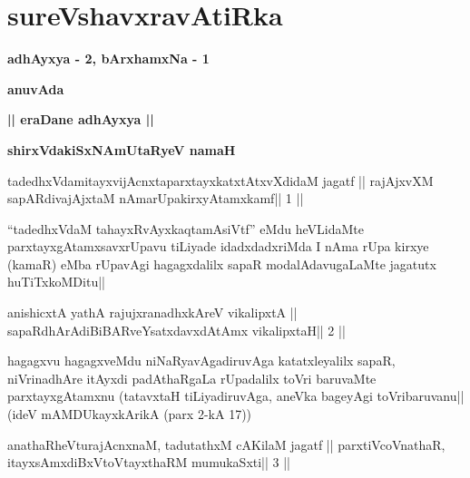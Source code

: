 \chapter{sureVshavxravAtiRka}

\begin{center}
{\Large\textbf{adhAyxya - 2, bArxhamxNa - 1}}
\medskip

{\large\textbf{anuvAda}}
\medskip

{\large\textbf{|| eraDane adhAyxya ||}}
\end{center}

\begin{center}
\centerline{\bf shirxVdakiSxNAmUtaRyeV namaH}
\medskip
\end{center}


\begin{shl}
tadedhxVdamitayxvijAcnxtaparxtayxkatxtAtxvXdidaM jagatf ||
rajAjxvXM sapARdivajAjxtaM nAmarUpakirxyAtamxkamf\hfill || 1 ||
\end{shl}

\begin{artha}
``tadedhxVdaM tahayxRvAyxkaqtamAsiVtf'' eMdu heVLidaMte parxtayxgAtamxsavxrUpavu tiLiyade idadxdadxriMda I nAma rUpa kirxye (kamaR) eMba rUpavAgi hagagxdalilx sapaR modalAdavugaLaMte jagatutx huTiTxkoMDitu||
\end{artha} 
 

\begin{shl}
anishicxtA yathA rajujxranadhxkAreV vikalipxtA ||
sapaRdhArAdiBiBARveYsatxdavxdAtAmx vikalipxtaH\hfill || 2 ||
\end{shl}

\begin{artha}
hagagxvu hagagxveMdu niNaRyavAgadiruvAga katatxleyalilx sapaR, 
niVrinadhAre itAyxdi padAthaRgaLa rUpadalilx toVri baruvaMte 
parxtayxgAtamxnu (tatavxtaH tiLiyadiruvAga, aneVka bageyAgi 
toVribaruvanu|| (ideV mAMDUkayxkArikA (parx 2-kA 17)) 
\end{artha}


\begin{shl}
anathaRheVturajAcnxnaM, tadutathxM cAKilaM jagatf ||
parxtiVcoV\s nathaR, itayxsAmxdiBxVtoV\s tayxthaRM mumukaSxti\hfill || 3 ||
\end{shl}

